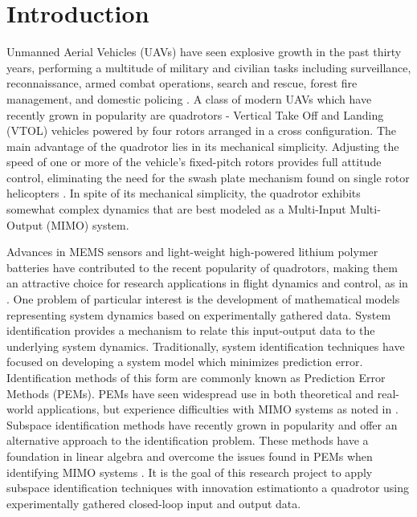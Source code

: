 \chapter{Introduction}

Unmanned Aerial Vehicles (UAVs) have seen explosive growth in the past thirty years, performing a multitude of military and civilian tasks including surveillance, reconnaissance, armed combat operations, search and rescue, forest fire management, and domestic policing \cite{sarris2001survey, valavanis2007advances}. A class of modern UAVs which have recently grown in popularity are quadrotors -  Vertical Take Off and Landing (VTOL) vehicles powered by four rotors arranged in a cross configuration. The main advantage of the quadrotor lies in its mechanical simplicity. Adjusting the speed of one or more of the vehicle's fixed-pitch rotors provides full attitude control, eliminating the need for the swash plate mechanism found on single rotor helicopters \cite{bramwell2001bramwell, gupte2012survey}. In spite of its mechanical simplicity, the quadrotor exhibits somewhat complex dynamics that are best modeled as a Multi-Input Multi-Output (MIMO) system.

Advances in MEMS sensors and light-weight high-powered lithium polymer batteries have contributed to the recent popularity of quadrotors, making them an attractive choice for research applications in flight dynamics and control, as in \cite{hoffmann2007quadrotor, kivrak2006design, mellinger2010control, michael2010grasp}. One problem of particular interest is the development of mathematical models representing system dynamics based on experimentally gathered data. System identification provides a mechanism to relate this input-output data to the underlying system dynamics. Traditionally, system identification techniques have focused on developing a system model which minimizes prediction error. Identification methods of this form are commonly known as Prediction Error Methods (PEMs). PEMs have seen widespread use in both theoretical and real-world applications, but experience difficulties with MIMO systems as noted in \cite{qin2006overview, viberg1995subspace}. Subspace identification methods have recently grown in popularity and offer an alternative approach to the identification problem. These methods have a foundation in linear algebra and overcome the issues found in PEMs when identifying MIMO systems \cite{katayama2005subspace}. It is the goal of this research project to apply subspace identification techniques with innovation estimationto a quadrotor using experimentally gathered closed-loop input and output data.



